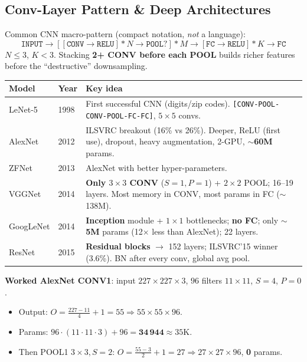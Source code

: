 \documentclass[10pt,a4paper]{article}
\begin{document}
	\subsection{Conv-Layer Pattern \& Deep Architectures}

	\begin{importantbox}
		Common CNN macro-pattern (compact notation, \emph{not} a language):
		\[
		\texttt{INPUT} \to [[\texttt{CONV}\to\texttt{RELU}]{*}N \to \texttt{POOL?}]{*}M \to [\texttt{FC}\to\texttt{RELU}]{*}K \to \texttt{FC}
		\]
		$N{\le}3$, $K{<}3$. Stacking \textbf{2+ CONV before each POOL} builds richer features before the ``destructive'' downsampling.
	\end{importantbox}

	\begin{center}\footnotesize
	\begin{tabular}{@{}llp{6.3cm}@{}}
		\toprule
		Model & Year & Key idea \\
		\midrule
		LeNet-5  & 1998 & First successful CNN (digits/zip codes). \texttt{[CONV-POOL-CONV-POOL-FC-FC]}, $5{\times}5$ convs. \\
		AlexNet  & 2012 & ILSVRC breakout (16\% vs 26\%). Deeper, ReLU (first use), dropout, heavy augmentation, 2-GPU, \textbf{$\sim$60M} params. \\
		ZFNet    & 2013 & AlexNet with better hyper-parameters. \\
		VGGNet   & 2014 & \textbf{Only $3{\times}3$ CONV} ($S{=}1,P{=}1$) + $2{\times}2$ POOL; 16--19 layers. Most memory in CONV, most params in FC ($\sim$138M). \\
		GoogLeNet& 2014 & \textbf{Inception} module + $1{\times}1$ bottlenecks; \textbf{no FC}; only \textbf{$\sim$5M} params (12$\times$ less than AlexNet); 22 layers. \\
		ResNet   & 2015 & \textbf{Residual blocks} $\rightarrow$ 152 layers; ILSVRC'15 winner (3.6\%). BN after every conv, global avg pool. \\
		\bottomrule
	\end{tabular}
	\end{center}

	\begin{examtipbox}
		\textbf{Worked AlexNet CONV1}: input $227{\times}227{\times}3$, $96$ filters $11{\times}11$, $S{=}4$, $P{=}0$.
		\begin{itemize}[leftmargin=*]
			\item Output: $O=\frac{227-11}{4}+1=55 \Rightarrow 55{\times}55{\times}96$.
			\item Params: $96{\cdot}(11{\cdot}11{\cdot}3)+96 = \mathbf{34\,944}\approx35\text{K}$.
			\item Then POOL1 $3{\times}3,S{=}2$: $O=\frac{55-3}{2}+1=27 \Rightarrow 27{\times}27{\times}96$, \textbf{0} params.
		\end{itemize}
	\end{examtipbox}
\end{document}
